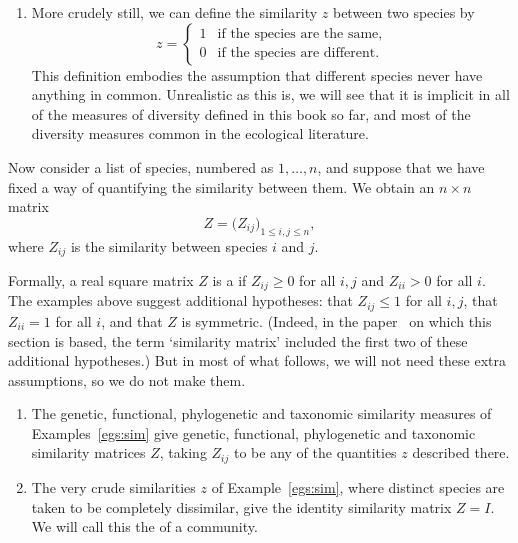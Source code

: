 \begin{examples}
\begin{enumerate}
\item
{}
More crudely still, we can define the similarity $z$ between two species by
\[
z
=
\begin{cases}
1       &\text{if the species are the same,}     \\
0       &\text{if the species are different}.
\end{cases}
\]
This definition embodies the assumption that different species never have
anything in common. Unrealistic as this is, we will see that it is implicit
in all of the measures of diversity defined in this book so far, and most
of the diversity measures common in the ecological literature.
\end{enumerate}
\end{examples}

Now consider a list of species, numbered as $1, \ldots, n$, and suppose
that we have fixed a way of quantifying the similarity between them.
We obtain an $n \times n$ matrix 
\[
Z = \bigl(Z_{ij}\bigr)_{1 \leq i, j \leq n},
\]
where $Z_{ij}$ is the similarity between species $i$ and $j$.

Formally, a real square matrix $Z$ is a
 if $Z_{ij} \geq 0$ for all $i, j$ and $Z_{ii} > 0$ for all $i$.
The examples above suggest additional hypotheses: that $Z_{ij} \leq 1$ for
all $i, j$, that $Z_{ii} = 1$ for all $i$, and that $Z$ is
symmetric.  (Indeed, in the paper~\cite{MDISS} on which this section is
based, the term `similarity matrix' included the first two of these
additional hypotheses.)  But in most of what follows, we will not need
these extra assumptions, so we do not make them.

\begin{examples}
\begin{enumerate}
\item 
The genetic, functional, phylogenetic and taxonomic similarity measures of
Examples~\ref{egs:sim} give genetic, functional, phylogenetic and taxonomic
similarity matrices $Z$, taking $Z_{ij}$ to be any of the quantities $z$
described there.

\item
{}
The very crude similarities $z$ of
Example~\ref{egs:sim}, where distinct species are taken
to be completely dissimilar, give the identity similarity matrix $Z = I$.
We will call this the  of a community.
\end{enumerate}
\end{examples}

